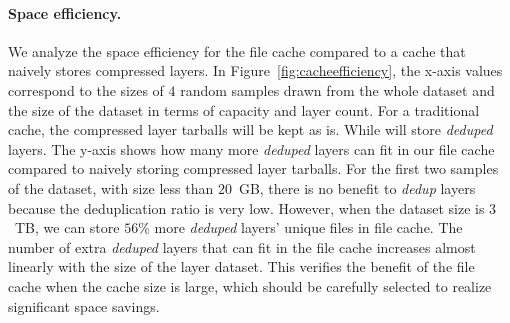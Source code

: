%

\vspace{-6pt}
\paragraph{Space efficiency.}
We analyze the space efficiency for the file cache compared to a cache that naively stores
compressed layers.
%
%
In Figure~\ref{fig:cacheefficiency}, the x-axis values correspond to the sizes of $4$ random samples drawn from the whole dataset and the size of the dataset in terms of capacity and layer count.
For a traditional cache, the compressed layer tarballs will be kept as is.
While \sysname will store \emph{deduped} layers. 
The y-axis shows how many more \emph{deduped} layers can fit in our file cache compared to naively storing compressed layer tarballs.
For the first two samples of the dataset, with size less than $20$~GB, 
there is no benefit to \emph{dedup} layers 
because the deduplication ratio is very low.
However, when the dataset size is $3$~TB, we can store $56$\% more \emph{deduped} layers' unique files in file cache.
The number of extra \emph{deduped} layers that can fit in the file cache increases almost linearly with the size of the layer dataset.
This verifies the benefit of the file cache when the cache size is large, which should be carefully selected to realize significant space savings.


